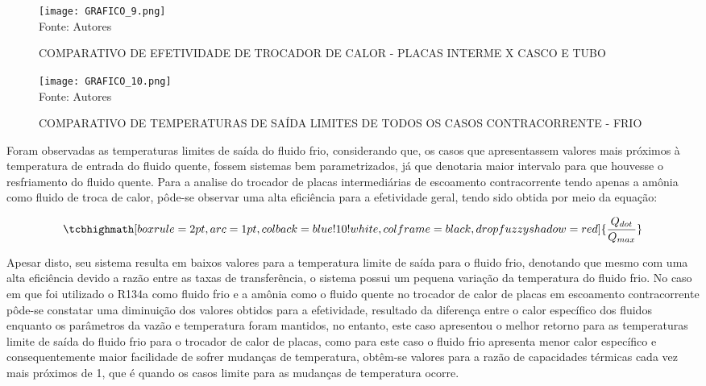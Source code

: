 \documentclass[a4paper,12pt,oneside]{article}
\begin{document}
\begin{flushright}
\pagebreak
\clearpage
\newpage

\begin{figure}[h]
	\centering
	\caption{COMPARATIVO DE EFETIVIDADE DE TROCADOR DE CALOR - PLACAS INTERME X CASCO E TUBO}
	\vspace{0.5cm}
	\texttt{[image: GRAFICO\_9.png]}
	\vspace{0.5cm}\\
	Fonte: Autores
\end{figure}
\vspace{0.5cm}

\pagebreak
\clearpage
\newpage
\begin{figure}[h]
	\centering
	\caption{COMPARATIVO DE TEMPERATURAS DE SAÍDA LIMITES DE TODOS OS CASOS CONTRACORRENTE - FRIO}
	\vspace{0.5cm}
	\texttt{[image: GRAFICO\_10.png]}
	\vspace{0.5cm}\\
	Fonte: Autores
\end{figure}
\vspace{0.5cm}
Foram observadas as temperaturas limites de saída do fluido frio, considerando que, os casos que apresentassem valores mais próximos à temperatura de entrada do fluido quente, fossem sistemas bem parametrizados, já que denotaria maior intervalo para que houvesse o resfriamento do fluido quente. Para a analise do trocador de placas intermediárias de escoamento contracorrente  tendo apenas a amônia como fluido de troca de calor, pôde-se observar uma alta eficiência para a efetividade geral, tendo sido obtida por meio da equação:

 \begin{equation}
 \tcbhighmath[boxrule=2pt,arc=1pt,colback=blue!10!white,colframe=black,
 drop fuzzy shadow=red]{\frac{Q_{dot}}{Q_{max}}}
 \end{equation}
 \vspace{0.5cm}
 
 Apesar disto, seu sistema resulta em baixos valores para a temperatura limite de saída para o fluido frio, denotando que mesmo com uma alta eficiência devido a razão entre as taxas de transferência, o sistema possui um pequena variação da temperatura do fluido frio. No caso em que foi utilizado o R134a como fluido frio e a amônia como o fluido quente no trocador de calor de placas em escoamento contracorrente pôde-se constatar uma diminuição dos valores obtidos para a efetividade, resultado da diferença entre o calor específico dos fluidos enquanto os parâmetros da vazão e temperatura foram mantidos, no entanto, este caso apresentou o melhor retorno para as temperaturas limite de saída do fluido frio para o trocador de calor de placas, como para este caso o fluido frio apresenta menor calor específico e consequentemente maior facilidade de sofrer mudanças de temperatura, obtêm-se valores para a razão de capacidades térmicas cada vez mais próximos de 1, que é quando os casos limite para as mudanças de temperatura ocorre.


\end{flushright}
\end{document}
